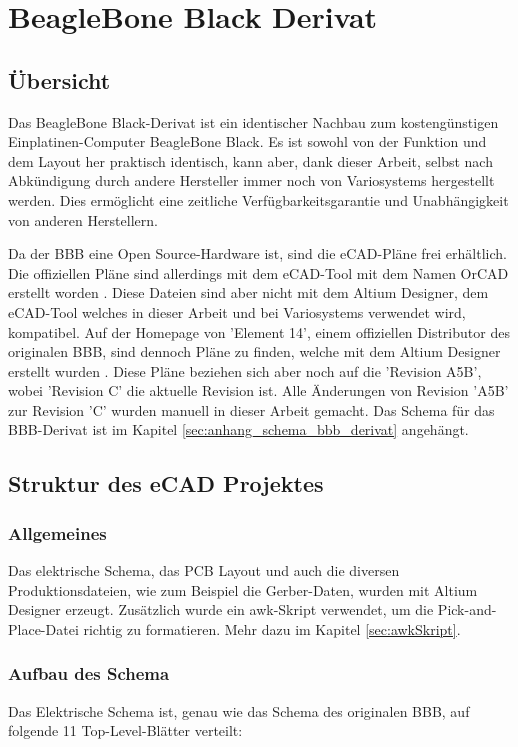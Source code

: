 \chapter{BeagleBone Black Derivat}



\section{Übersicht}
Das BeagleBone Black-Derivat ist ein identischer Nachbau zum kostengünstigen Einplatinen-Computer BeagleBone Black. Es ist sowohl von der Funktion und dem Layout her praktisch identisch, kann aber, dank dieser Arbeit, selbst nach Abkündigung durch andere Hersteller immer noch von Variosystems hergestellt werden. Dies ermöglicht eine zeitliche Verfügbarkeitsgarantie und Unabhängigkeit von anderen Herstellern.


Da der BBB eine Open Source-Hardware ist, sind die eCAD-Pläne frei erhältlich. Die offiziellen Pläne sind allerdings mit dem eCAD-Tool mit dem Namen OrCAD erstellt worden \cite{bbbOrcad}. Diese Dateien sind aber nicht mit dem Altium Designer, dem eCAD-Tool welches in dieser Arbeit und bei Variosystems verwendet wird, kompatibel. Auf der Homepage von 'Element 14', einem offiziellen Distributor des originalen BBB, sind dennoch Pläne zu finden, welche mit dem Altium Designer erstellt wurden \cite{element14AltiumBBB}. Diese Pläne beziehen sich aber noch auf die 'Revision A5B', wobei 'Revision C' die aktuelle Revision ist. Alle Änderungen von Revision 'A5B' zur Revision 'C' wurden manuell in dieser Arbeit gemacht. Das Schema für das BBB-Derivat ist im Kapitel \ref{sec:anhang_schema_bbb_derivat} angehängt.



\section{Struktur des eCAD Projektes}

\subsection{Allgemeines}
Das elektrische Schema, das PCB Layout und auch die diversen Produktionsdateien, wie zum Beispiel die Gerber-Daten, wurden mit Altium Designer erzeugt. Zusätzlich wurde ein awk-Skript verwendet, um die Pick-and-Place-Datei richtig zu formatieren. Mehr dazu im Kapitel \ref{sec:awkSkript}.

\subsection{Aufbau des Schema}
Das Elektrische Schema ist, genau wie das Schema des originalen BBB, auf folgende 11 Top-Level-Blätter verteilt:

